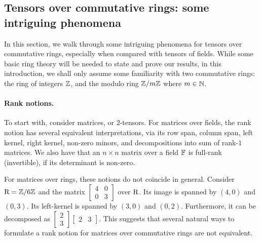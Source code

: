 


\subsection{Tensors over commutative rings: some intriguing phenomena}\label{subsec:intriguing}

In this section, we walk through some intriguing phenomena for tensors over commutative rings, especially when compared with tensors of fields. While some basic ring theory will be needed to state and prove our results, in this introduction, we shall only assume some familiarity with two commutative rings: the ring of integers $\mathbb{Z}$, and the modulo ring $\mathbb{Z}/m\mathbb{Z}$ where $m\in\mathbb{N}$.




\paragraph{Rank notions.} To start with, consider matrices, or $2$-tensors. 
For matrices over fields, the rank notion has several equivalent interpretations, via its row span, column span, left kernel, right kernel, non-zero minors, and decompositions into sum of rank-$1$ matrices. We also have that an $n\times n$ matrix over a field $\mathbb{F}$ is full-rank (invertible), if its determinant is non-zero.

For matrices over rings, these notions do not coincide in general. Consider $\mathrm{R}=\mathbb{Z}/6\mathbb{Z}$ and the matrix $\begin{bmatrix}
	4 & 0 \\
	0 & 3
\end{bmatrix}$ over $\mathrm{R}$. Its image is spanned by $(4, 0)$ and $(0, 3)$. Its left-kernel is spanned by $(3, 0)$ and $(0, 2)$. Furthermore, it can be decomposed as $\begin{bmatrix}
	2\\3\end{bmatrix}\begin{bmatrix}
	2 & 3
\end{bmatrix}$. This suggests that several natural ways to formulate a rank notion for matrices over commutative rings are not equivalent.

